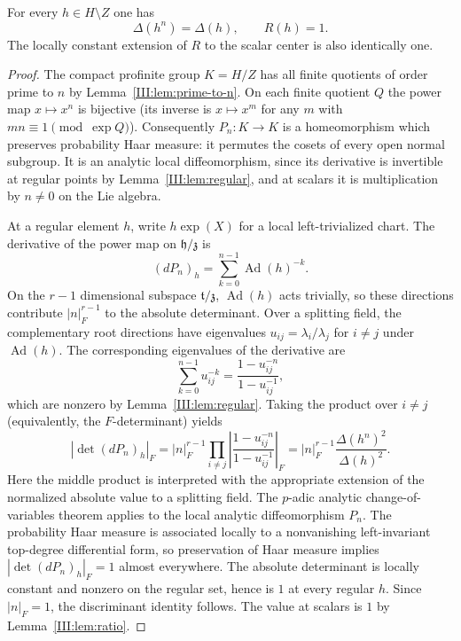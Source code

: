 \begin{lemma}\label{III:lem:tame-R}
For every $h\in H\setminus Z$ one has
\[
\boxed{\;\Delta(h^n)=\Delta(h),\qquad R(h)=1.\;}
\]
The locally constant extension of $R$ to the scalar center is also
identically one.
\end{lemma}
\begin{proof}
The compact profinite group $K=H/Z$ has all finite quotients of
order prime to $n$ by Lemma~\ref{III:lem:prime-to-n}. On each finite
quotient $Q$ the power map $x\mapsto x^n$ is bijective (its inverse
is $x\mapsto x^m$ for any $m$ with $mn\equiv1\pmod{\exp Q}$).
Consequently $P_n:K\to K$ is a homeomorphism which preserves
probability Haar measure: it permutes the cosets of every open
normal subgroup. It is an analytic local diffeomorphism, since
its derivative is invertible at regular points by
Lemma~\ref{III:lem:regular}, and at scalars it is multiplication by
$n\ne0$ on the Lie algebra.

At a regular element $h$, write $h\exp(X)$ for a local
left-trivialized chart. The derivative of the power map on
$\mathfrak h/\mathfrak z$ is
\[
(dP_n)_h=\sum_{k=0}^{n-1}\operatorname{Ad}(h)^{-k}.
\]
On the $r-1$ dimensional subspace $\mathfrak t/\mathfrak z$,
$\operatorname{Ad}(h)$ acts trivially, so these directions contribute
$|n|_F^{r-1}$ to the absolute determinant. Over a splitting field,
the complementary root directions have eigenvalues
$u_{ij}=\lambda_i/\lambda_j$ for $i\ne j$ under
$\operatorname{Ad}(h)$. The corresponding eigenvalues of the
derivative are
\[
\sum_{k=0}^{n-1}u_{ij}^{-k}
=\frac{1-u_{ij}^{-n}}{1-u_{ij}^{-1}},
\]
which are nonzero by Lemma~\ref{III:lem:regular}. Taking the product
over $i\ne j$ (equivalently, the $F$-determinant) yields
\[
|\det(dP_n)_h|_F
=|n|_F^{r-1}\prod_{i\ne j}
  \left|\frac{1-u_{ij}^{-n}}{1-u_{ij}^{-1}}\right|_F
=|n|_F^{r-1}\frac{\Delta(h^n)^2}{\Delta(h)^2}.
\]
Here the middle product is interpreted with the appropriate
extension of the normalized absolute value to a splitting field.
The $p$-adic analytic change-of-variables theorem
\cite[Proposition~1.2.1]{Loe08} applies to the local analytic
diffeomorphism $P_n$. The probability Haar measure is associated
locally to a nonvanishing left-invariant top-degree differential
form, so preservation of Haar measure implies
$|\det(dP_n)_h|_F=1$ almost everywhere. The absolute determinant
is locally constant and nonzero on the regular set, hence is $1$
at every regular $h$. Since $|n|_F=1$, the discriminant identity
follows. The value at scalars is $1$ by Lemma~\ref{III:lem:ratio}.
\end{proof}

